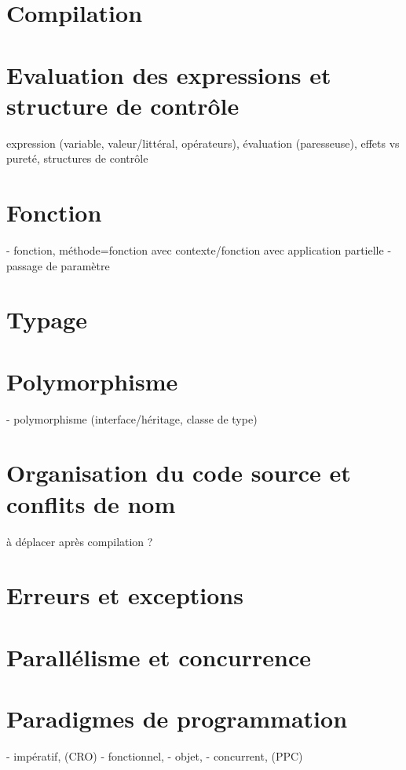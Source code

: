\documentclass[a4paper,francais]{insalyon}
\begin{document}
\section{Compilation}

\section{Evaluation des expressions et structure de contrôle}

expression (variable, valeur/littéral, opérateurs), évaluation (paresseuse), effets vs pureté, structures de contrôle

\section{Fonction}

- fonction, méthode=fonction avec contexte/fonction avec application partielle
- passage de paramètre

\section{Typage}

\section{Polymorphisme}

- polymorphisme (interface/héritage, classe de type)

\section{Organisation du code source et conflits de nom}

à déplacer après compilation ?

\section{Erreurs et exceptions}

\section{Parallélisme et concurrence}

\section{Paradigmes de programmation}

- impératif, (CRO)
- fonctionnel, 
- objet, 
- concurrent, (PPC)



\end{document}
